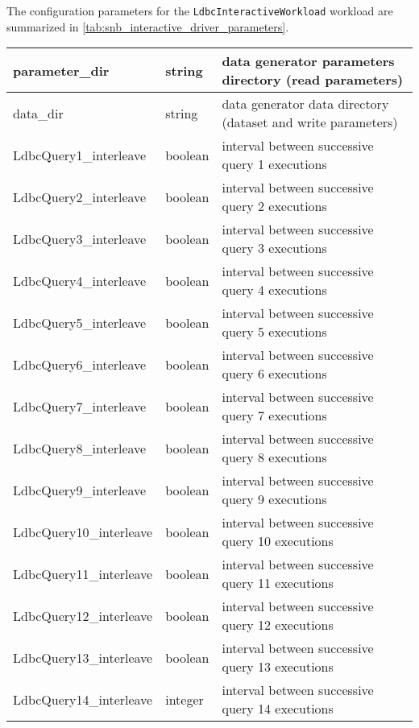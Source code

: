 The configuration parameters for the \texttt{LdbcInteractiveWorkload} workload are summarized in \autoref{tab:snb_interactive_driver_parameters}.

\begin{table}[h!]
	\label{tab:snb_interactive_driver_parameters}
	\begin{center}
		\begin{tabular}{|l|l|l|}
		\hline
		parameter\_dir &
		string &
		data generator parameters directory (read parameters) \\
		\hline
		data\_dir &
		string &
		data generator data directory (dataset and write parameters) \\
		\hline
		LdbcQuery1\_interleave &
		boolean &
		interval between successive query 1 executions\\
		\hline
		LdbcQuery2\_interleave &
		boolean &
		interval between successive query 2 executions\\
		\hline
		LdbcQuery3\_interleave &
		boolean &
		interval between successive query 3 executions\\
		\hline
		LdbcQuery4\_interleave &
		boolean &
		interval between successive query 4 executions\\
		\hline
		LdbcQuery5\_interleave &
		boolean &
		interval between successive query 5 executions\\
		\hline
		LdbcQuery6\_interleave &
		boolean &
		interval between successive query 6 executions\\
		\hline
		LdbcQuery7\_interleave &
		boolean &
		interval between successive query 7 executions\\
		\hline
		LdbcQuery8\_interleave &
		boolean &
		interval between successive query 8 executions\\
		\hline
		LdbcQuery9\_interleave &
		boolean &
		interval between successive query 9 executions\\
		\hline
		LdbcQuery10\_interleave &
		boolean &
		interval between successive query 10 executions\\
		\hline
		LdbcQuery11\_interleave &
		boolean &
		interval between successive query 11 executions\\
		\hline
		LdbcQuery12\_interleave &
		boolean &
		interval between successive query 12 executions\\
		\hline
		LdbcQuery13\_interleave &
		boolean &
		interval between successive query 13 executions\\
		\hline
		LdbcQuery14\_interleave &
		integer &
		interval between successive query 14 executions\\

\end{tabular}
\end{center}
\end{table}
